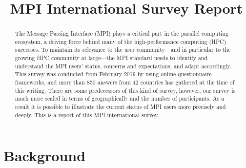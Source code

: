 \documentclass[conference,10pt,letterpaper]{IEEEtran}
\begin{document}
\title{MPI International Survey Report}

\author{
  \and
  \and
  \and
  \and
  \and
  \and
}  

\maketitle

\begin{abstract}
The Message Passing Interface (MPI) plays a critical part in the
parallel computing ecosystem, a driving force behind many of the
high-performance computing (HPC) successes. To maintain its relevance
to the user community---and in particular to the growing HPC community
at large---the MPI standard needs to identify and understand the MPI
users' status, concerns and expectations, and adapt accordingly.
This survey was conducted from February 2019 by using online
questionnaire frameworks, and more than 850 answers from 42 countries
has gathered at the time of this writing. 
There are some predecessors of this kind of survey, however, our
survey is much more scaled in terms of geographically and the number
of participants. As a result it is possible to illustrate the current
status of MPI users more precisely and deeply. This is a report of
this MPI international survey.
\end{abstract}

\section{Background}
\end{document}
